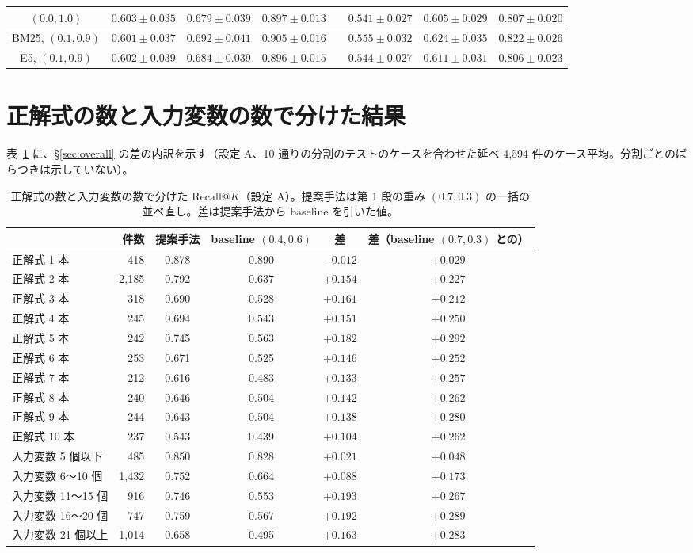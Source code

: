 \documentclass[a4j,dvipdfmx,11pt]{jresume}
\makeatletter
\newcommand{\rk}{\textrm{Recall@}K}
\makeatother
\begin{document}
\begin{table}[h]
\begin{tabular}{@{}cccccccc@{}}
$(0.0, 1.0)$ & $0.603 \pm 0.035$ & $0.679 \pm 0.039$ & $0.897 \pm 0.013$ & & $0.541 \pm 0.027$ & $0.605 \pm 0.029$ & $0.807 \pm 0.020$ \\
\midrule
BM25, $(0.1, 0.9)$ & $0.601 \pm 0.037$ & $0.692 \pm 0.041$ & $0.905 \pm 0.016$ & & $0.555 \pm 0.032$ & $0.624 \pm 0.035$ & $0.822 \pm 0.026$ \\
E5, $(0.1, 0.9)$ & $0.602 \pm 0.039$ & $0.684 \pm 0.039$ & $0.896 \pm 0.015$ & & $0.544 \pm 0.027$ & $0.611 \pm 0.031$ & $0.806 \pm 0.023$ \\
\bottomrule
\end{tabular}
\end{table}

\section{正解式の数と入力変数の数で分けた結果}\label{app:bucket}
表~\ref{tab:bucket} に、\S\ref{sec:overall} の差の内訳を示す（設定 A、10 通りの分割のテストのケースを合わせた延べ 4{,}594 件のケース平均。分割ごとのばらつきは示していない）。

\begin{table}[h]\centering
\small
\caption{正解式の数と入力変数の数で分けた $\rk$（設定 A）。提案手法は第 1 段の重み $(0.7, 0.3)$ の一括の並べ直し。差は提案手法から baseline を引いた値。}
\label{tab:bucket}
\begin{tabular}{@{}lrcccc@{}}
\toprule
 & 件数 & 提案手法 & baseline $(0.4, 0.6)$ & 差 & 差（baseline $(0.7, 0.3)$ との） \\
\midrule
正解式 1 本 & 418 & 0.878 & 0.890 & $-0.012$ & $+0.029$ \\
正解式 2 本 & 2{,}185 & 0.792 & 0.637 & $+0.154$ & $+0.227$ \\
正解式 3 本 & 318 & 0.690 & 0.528 & $+0.161$ & $+0.212$ \\
正解式 4 本 & 245 & 0.694 & 0.543 & $+0.151$ & $+0.250$ \\
正解式 5 本 & 242 & 0.745 & 0.563 & $+0.182$ & $+0.292$ \\
正解式 6 本 & 253 & 0.671 & 0.525 & $+0.146$ & $+0.252$ \\
正解式 7 本 & 212 & 0.616 & 0.483 & $+0.133$ & $+0.257$ \\
正解式 8 本 & 240 & 0.646 & 0.504 & $+0.142$ & $+0.262$ \\
正解式 9 本 & 244 & 0.643 & 0.504 & $+0.138$ & $+0.280$ \\
正解式 10 本 & 237 & 0.543 & 0.439 & $+0.104$ & $+0.262$ \\
\midrule
入力変数 5 個以下 & 485 & 0.850 & 0.828 & $+0.021$ & $+0.048$ \\
入力変数 6〜10 個 & 1{,}432 & 0.752 & 0.664 & $+0.088$ & $+0.173$ \\
入力変数 11〜15 個 & 916 & 0.746 & 0.553 & $+0.193$ & $+0.267$ \\
入力変数 16〜20 個 & 747 & 0.759 & 0.567 & $+0.192$ & $+0.289$ \\
入力変数 21 個以上 & 1{,}014 & 0.658 & 0.495 & $+0.163$ & $+0.283$ \\
\bottomrule
\end{tabular}
\end{table}
\end{document}

